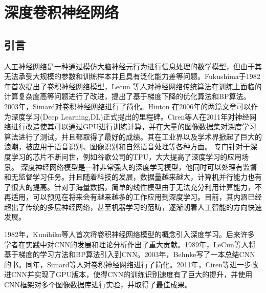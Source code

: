 \chapter{深度卷积神经网络}

\section{引言}


人工神经网络\cite{hebb2005organization}是一种通过模仿大脑神经元行为进行信息处理的数学模型，但由于其无法承受大规模的参数和训练样本并且具有泛化能力差等问题。Fukushima\cite{fukushima1982neocognitron}于1982年首次提出了卷积神经网络模型，Lecun 等人对神经网络传统算法在训练上面临的计算复杂度高等问题进行了改进，提出了基于梯度下降的优化算法\cite{lecun1998gradient}和BP算法\cite{lecun1989backpropagation}。2003年，Simard对卷积神经网络进行了简化\cite{simard2003best}。Hinton 在2006年的两篇文章\cite{hinton2006reducing,hinton2006fast}可以作为深度学习(Deep Learning,DL)正式提出的里程碑。Ciren等人\cite{ciresan2011flexible}在2011年对神经网络进行改造使其可以通过GPU进行训练计算，并在大量的图像数据集对深度学习算法进行了测试，并且都取得了最好的成绩。其在工业界以及学术界掀起了巨大的浪潮，被应用于语音识别\cite{hinton2012deep}、图像识别\cite{krizhevsky2012imagenet}和自然语音处理\cite{collobert2011natural}等各种方面。 专门针对于深度学习的芯片不断问世，例如谷歌公司的TPU\cite{jouppi2017datacenter}，大大提高了深度学习的应用场景。
深度神经网络模型是一种非常强大的深度学习模型，他同时可以处理有监督和无监督学习任务。并且随着科技的发展，数据量越来越大，计算机并行能力也有了很大的提高。针对于海量数据，简单的线性模型由于无法充分利用计算能力，不再适用，可以预见在将来会有越来越多的工作应用到深度学习。目前，其内涵已经超出了传统的多层神经网络，甚至机器学习的范畴，逐渐朝着人工智能的方向快速发展\cite{silver2017mastering}。

1982年，Kunihiko等人\cite{fukushima1982neocognitron}首次将卷积神经网络模型的概念引入深度学习。后来许多学者在实践中对CNN的发展和理论分析作出了重大贡献。1989年，LeCun等人将基于梯度的学习方法\cite{lecun1998gradient}和BP算法\cite{lecun1989backpropagation}引入到CNN。2003年，Behnke写了一本总结CNN\cite{behnke2003hierarchical}的书。同年，Simard等人\cite{simard2003best}对卷积神经网络进行了简化。2011年，Ciren等\cite{ciresan2011flexible}进一步改进CNN并实现了GPU版本，使得CNN的训练识别速度有了巨大的提升，并使用CNN框架对多个图像数据库进行实验，并取得了最佳成果。

